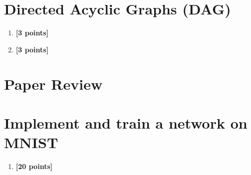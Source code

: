 \documentclass[11pt,english]{article}
\begin{document}
\section{Directed Acyclic Graphs (DAG)}


\begin{enumerate}[resume]

\item
\textbf{[3 points]}


\item
\textbf{[3 points]}


\end{enumerate}

\section{Paper Review}



\section{Implement and train a network on MNIST}

\begin{enumerate}[resume]

\item
\textbf{[20 points]}


\end{enumerate}
\end{document}
